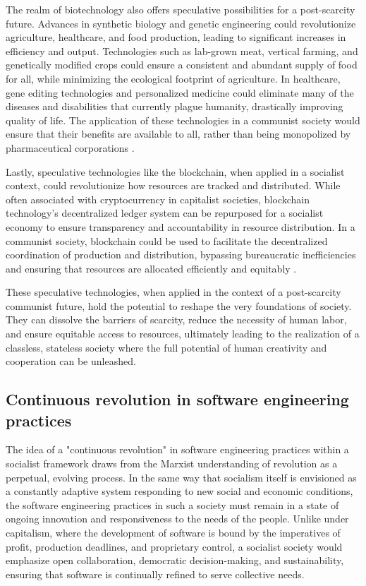 \begin{refsection}
The realm of biotechnology also offers speculative possibilities for a post-scarcity future. Advances in synthetic biology and genetic engineering could revolutionize agriculture, healthcare, and food production, leading to significant increases in efficiency and output. Technologies such as lab-grown meat, vertical farming, and genetically modified crops could ensure a consistent and abundant supply of food for all, while minimizing the ecological footprint of agriculture. In healthcare, gene editing technologies and personalized medicine could eliminate many of the diseases and disabilities that currently plague humanity, drastically improving quality of life. The application of these technologies in a communist society would ensure that their benefits are available to all, rather than being monopolized by pharmaceutical corporations \cite[pp.~241-243]{harari2015}.

Lastly, speculative technologies like the blockchain, when applied in a socialist context, could revolutionize how resources are tracked and distributed. While often associated with cryptocurrency in capitalist societies, blockchain technology’s decentralized ledger system can be repurposed for a socialist economy to ensure transparency and accountability in resource distribution. In a communist society, blockchain could be used to facilitate the decentralized coordination of production and distribution, bypassing bureaucratic inefficiencies and ensuring that resources are allocated efficiently and equitably \cite[pp.~84-86]{wark2021}.

These speculative technologies, when applied in the context of a post-scarcity communist future, hold the potential to reshape the very foundations of society. They can dissolve the barriers of scarcity, reduce the necessity of human labor, and ensure equitable access to resources, ultimately leading to the realization of a classless, stateless society where the full potential of human creativity and cooperation can be unleashed.

\subsection{Continuous revolution in software engineering practices}

The idea of a "continuous revolution" in software engineering practices within a socialist framework draws from the Marxist understanding of revolution as a perpetual, evolving process. In the same way that socialism itself is envisioned as a constantly adaptive system responding to new social and economic conditions, the software engineering practices in such a society must remain in a state of ongoing innovation and responsiveness to the needs of the people. Unlike under capitalism, where the development of software is bound by the imperatives of profit, production deadlines, and proprietary control, a socialist society would emphasize open collaboration, democratic decision-making, and sustainability, ensuring that software is continually refined to serve collective needs.


\end{refsection}
